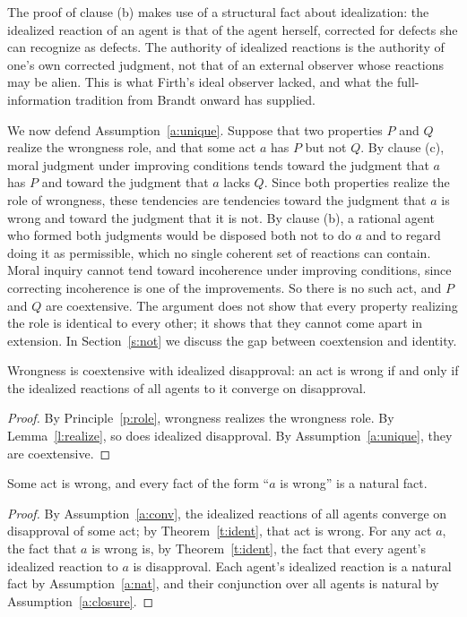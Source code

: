 \documentclass{situationist-preprint}
\begin{document}
The proof of clause (b) makes use of a structural fact about idealization: the idealized reaction of an agent is that of the agent herself, corrected for defects she can recognize as defects. The authority of idealized reactions is the authority of one's own corrected judgment, not that of an external observer whose reactions may be alien. This is what Firth's ideal observer lacked, and what the full-information tradition from Brandt onward has supplied.

We now defend Assumption~\ref{a:unique}. Suppose that two properties $P$ and $Q$ realize the wrongness role, and that some act $a$ has $P$ but not $Q$. By clause (c), moral judgment under improving conditions tends toward the judgment that $a$ has $P$ and toward the judgment that $a$ lacks $Q$. Since both properties realize the role of wrongness, these tendencies are tendencies toward the judgment that $a$ is wrong and toward the judgment that it is not. By clause (b), a rational agent who formed both judgments would be disposed both not to do $a$ and to regard doing it as permissible, which no single coherent set of reactions can contain. Moral inquiry cannot tend toward incoherence under improving conditions, since correcting incoherence is one of the improvements. So there is no such act, and $P$ and $Q$ are coextensive. The argument does not show that every property realizing the role is identical to every other; it shows that they cannot come apart in extension. In Section~\ref{s:not} we discuss the gap between coextension and identity.

\begin{theorem}[Identification]\label{t:ident}
Wrongness is coextensive with idealized disapproval: an act is wrong if and only if the idealized reactions of all agents to it converge on disapproval.
\end{theorem}

\begin{proof}
By Principle~\ref{p:role}, wrongness realizes the wrongness role. By Lemma~\ref{l:realize}, so does idealized disapproval. By Assumption~\ref{a:unique}, they are coextensive.
\end{proof}

\begin{theorem}\label{t:realism}
Some act is wrong, and every fact of the form \enquote{$a$ is wrong} is a natural fact.
\end{theorem}

\begin{proof}
By Assumption~\ref{a:conv}, the idealized reactions of all agents converge on disapproval of some act; by Theorem~\ref{t:ident}, that act is wrong. For any act $a$, the fact that $a$ is wrong is, by Theorem~\ref{t:ident}, the fact that every agent's idealized reaction to $a$ is disapproval. Each agent's idealized reaction is a natural fact by Assumption~\ref{a:nat}, and their conjunction over all agents is natural by Assumption~\ref{a:closure}.
\end{proof}
\end{document}
